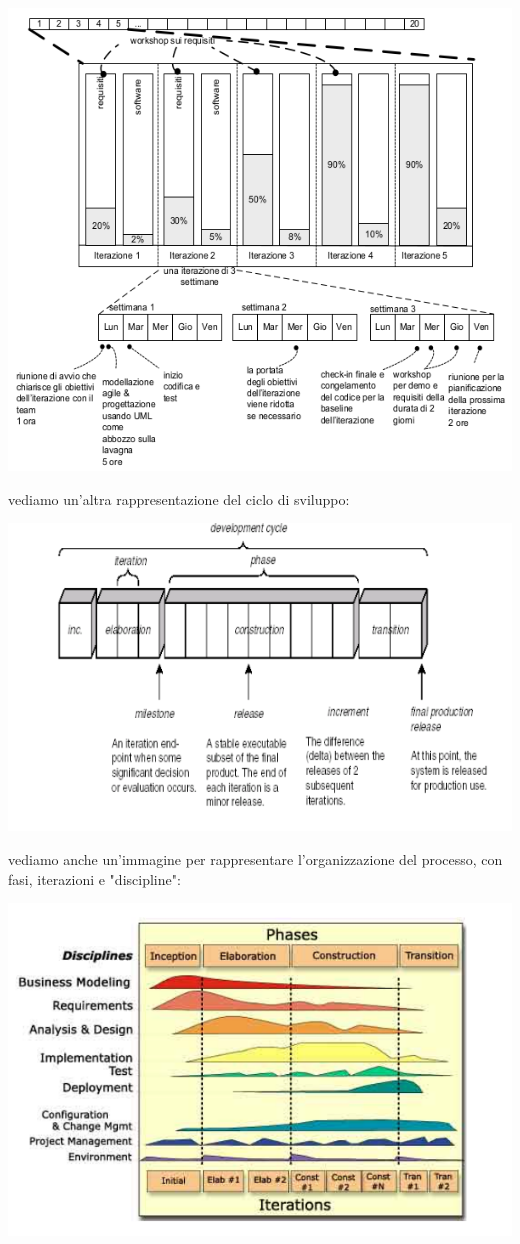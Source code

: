 \documentclass[a4paper,12pt, oneside]{book}
\begin{document}
\begin{center}
\includegraphics[scale=0.7]{img/ms7.png}
\end{center}
\newpage
vediamo un'altra rappresentazione del ciclo di sviluppo:
\begin{center}
\includegraphics[scale=0.65]{img/ms8.png}
\end{center}
vediamo anche un'immagine per rappresentare l'organizzazione del processo, con fasi, iterazioni e "discipline":
\begin{center}
\includegraphics[scale=0.65]{img/ms9.png}
\end{center}
\end{document}

